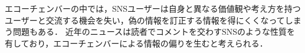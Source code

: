 \documentclass[12pt,a4j,dvipdfmx]{jreport}
\begin{document}
エコーチェンバーの中では，SNSユーザーは自身と異なる価値観や考え方を持つユーザーと交流する機会を失い，偽の情報を訂正する情報を得にくくなってしまう問題もある\cite{__2020-5}．
近年のニュースは読者でコメントを交わすSNSのような性質を有しており\cite{nagulendra_understanding_2014}，エコーチェンバーによる情報の偏りを生むと考えられる．


\end{document}
